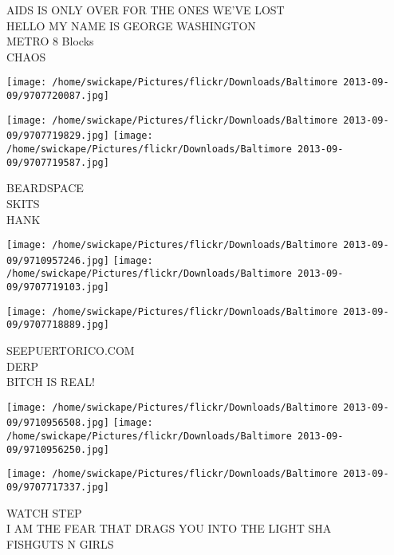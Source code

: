 \documentclass[10pt,letterpaper]{article}
\begin{document}
AIDS IS ONLY OVER FOR THE ONES WE'VE LOST\\
HELLO MY NAME IS GEORGE WASHINGTON\\
METRO 8 Blocks\\
CHAOS
\pagebreak

\texttt{[image: /home/swickape/Pictures/flickr/Downloads/Baltimore 2013-09-09/9707720087.jpg]}

\vspace{0.25in}
\texttt{[image: /home/swickape/Pictures/flickr/Downloads/Baltimore 2013-09-09/9707719829.jpg]}
\texttt{[image: /home/swickape/Pictures/flickr/Downloads/Baltimore 2013-09-09/9707719587.jpg]}

BEARDSPACE\\
SKITS\\
HANK
\pagebreak

\texttt{[image: /home/swickape/Pictures/flickr/Downloads/Baltimore 2013-09-09/9710957246.jpg]}
\texttt{[image: /home/swickape/Pictures/flickr/Downloads/Baltimore 2013-09-09/9707719103.jpg]}

\vspace{0.25in}
\texttt{[image: /home/swickape/Pictures/flickr/Downloads/Baltimore 2013-09-09/9707718889.jpg]}

SEEPUERTORICO.COM\\
DERP\\
BITCH IS REAL!
\pagebreak

\texttt{[image: /home/swickape/Pictures/flickr/Downloads/Baltimore 2013-09-09/9710956508.jpg]}
\texttt{[image: /home/swickape/Pictures/flickr/Downloads/Baltimore 2013-09-09/9710956250.jpg]}

\vspace{0.25in}
\texttt{[image: /home/swickape/Pictures/flickr/Downloads/Baltimore 2013-09-09/9707717337.jpg]}

WATCH STEP\\
I AM THE FEAR THAT DRAGS YOU INTO THE LIGHT SHA\\
FISHGUTS N GIRLS
\pagebreak
\end{document}
